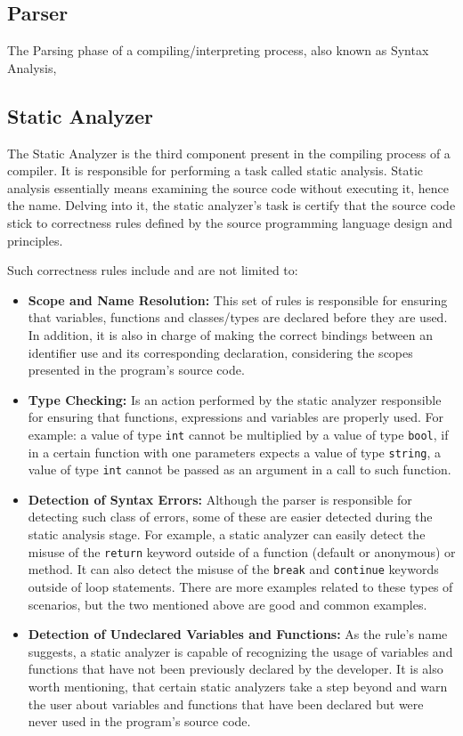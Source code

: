 \subsection{Parser}
The Parsing phase of a compiling/interpreting process, also known as Syntax Analysis,

\subsection{Static Analyzer}
The Static Analyzer is the third component present in the compiling process of a compiler. It is responsible for performing a task called static analysis. Static analysis essentially means examining the source code without executing it, hence the name. Delving into it, the static analyzer's task is certify that the source code stick to correctness rules defined by the source programming language design and principles.

Such correctness rules include and are not limited to:
\begin{itemize}
    \item \textbf{Scope and Name Resolution:} This set of rules is responsible for ensuring that variables, functions and classes/types are declared before they are used. In addition, it is also in charge of making the correct bindings between an identifier use and its corresponding declaration, considering the scopes presented in the program's source code.
    
    \item \textbf{Type Checking:} Is an action performed by the static analyzer responsible for ensuring that functions, expressions and variables are properly used. For example: a value of type \texttt{int} cannot be multiplied by a value of type \texttt{bool}, if in a certain function with one parameters expects a value of type \texttt{string}, a value of type \texttt{int} cannot be passed as an argument in a call to such function.
    
    \item \textbf{Detection of Syntax Errors:} Although the parser is responsible for detecting such class of errors, some of these are easier detected during the static analysis stage. For example, a static analyzer can easily detect the misuse of the \texttt{return} keyword outside of a function (default or anonymous) or method. It can also detect the misuse of the \texttt{break} and \texttt{continue} keywords outside of loop statements. There are more examples related to these types of scenarios, but the two mentioned above are good and common examples.
    
    \item \textbf{Detection of Undeclared Variables and Functions:} As the rule's name suggests, a static analyzer is capable of recognizing the usage of variables and functions that have not been previously declared by the developer. It is also worth mentioning, that certain static analyzers take a step beyond and warn the user about variables and functions that have been declared but were never used in the program's source code.
\end{itemize}

